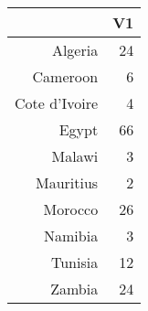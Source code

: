 \begin{table}[ht]
\centering
\begin{tabular}{rr}
  \hline
 & V1 \\ 
  \hline
Algeria &  24 \\ 
  Cameroon &   6 \\ 
  Cote d'Ivoire &   4 \\ 
  Egypt &  66 \\ 
  Malawi &   3 \\ 
  Mauritius &   2 \\ 
  Morocco &  26 \\ 
  Namibia &   3 \\ 
  Tunisia &  12 \\ 
  Zambia &  24 \\ 
   \hline
\end{tabular}
\end{table}
